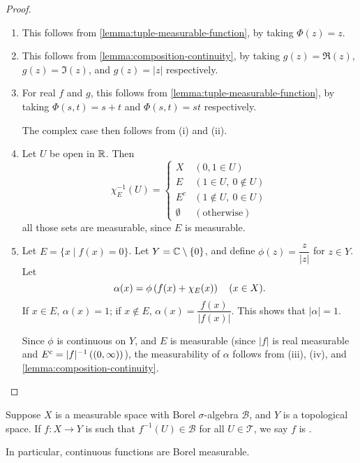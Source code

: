 \begin{proof} \
\begin{enumerate}[label=(\roman*)]
\item This follows from \ref{lemma:tuple-measurable-function}, by taking $\Phi(z)=z$.

\item This follows from \ref{lemma:composition-continuity}, by taking $g(z)=\Re(z)$, $g(z)=\Im(z)$, and $g(z)=|z|$ respectively.

\item For real $f$ and $g$, this follows from \ref{lemma:tuple-measurable-function}, by taking $\Phi(s,t)=s+t$ and $\Phi(s,t)=st$ respectively. 

The complex case then follows from (i) and (ii).

\item Let $U$ be open in $\mathbb R$. Then
\[\chi_E^{-1}(U)=\begin{cases}
X&(0,1\in U)\\
E&(1\in U,\:0\notin U)\\
E^c&(1\notin U,\:0\in U)\\
\emptyset&(\text{otherwise})
\end{cases}\]
all those sets are measurable, since $E$ is measurable.

\item Let $E=\{x\mid f(x)=0\}$. Let $Y=\mathbb C\setminus\{0\}$, and define $\phi(z)=\dfrac{z}{|z|}$ for $z\in Y$. Let
\[\alpha(x)=\phi\left(f(x)+\chi_E(x)\right)\quad(x\in X).\]
If $x\in E$, $\alpha(x)=1$; if $x\notin E$, $\alpha(x)=\dfrac{f(x)}{|f(x)|}$. This shows that $|\alpha|=1$.

Since $\phi$ is continuous on $Y$, and $E$ is measurable (since $|f|$ is real measurable and $E^c=|f|^{-1}\left((0,\infty)\right)$), the measurability of $\alpha$ follows from (iii), (iv), and \ref{lemma:composition-continuity}. 
\end{enumerate}
\end{proof}


\begin{definition}
Suppose $X$ is a measurable space with Borel $\sigma$-algebra $\mathcal{B}$, and $Y$ is a topological space. If $f\colon X\to Y$ is such that $f^{-1}(U)\in\mathcal{B}$ for all $U\in\mathcal{T}$, we say $f$ is .
\end{definition}

In particular, continuous functions are Borel measurable.

